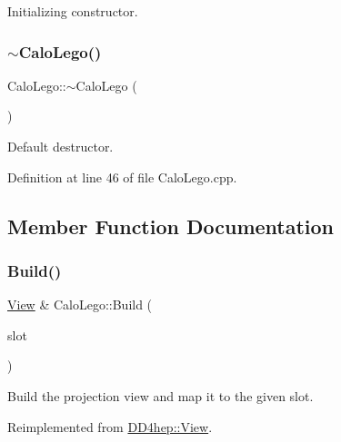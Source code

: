 Initializing constructor. 

\hypertarget{class_d_d4hep_1_1_calo_lego_a8416ec621ced1b3b415e48da1cd5c45b}{}\label{class_d_d4hep_1_1_calo_lego_a8416ec621ced1b3b415e48da1cd5c45b} 
\subsubsection{\texorpdfstring{$\sim$\+Calo\+Lego()}{~CaloLego()}}
{\footnotesize\ttfamily Calo\+Lego\+::$\sim$\+Calo\+Lego (\begin{DoxyParamCaption}{ }\end{DoxyParamCaption})\hspace{0.3cm}{\ttfamily [virtual]}}



Default destructor. 



Definition at line 46 of file Calo\+Lego.\+cpp.



\subsection{Member Function Documentation}
\hypertarget{class_d_d4hep_1_1_calo_lego_ab1ef28e69a78dbe27e6a33b1d22cc713}{}\label{class_d_d4hep_1_1_calo_lego_ab1ef28e69a78dbe27e6a33b1d22cc713} 
\subsubsection{\texorpdfstring{Build()}{Build()}}
{\footnotesize\ttfamily \hyperlink{class_d_d4hep_1_1_view}{View} \& Calo\+Lego\+::\+Build (\begin{DoxyParamCaption}\item[{T\+Eve\+Window $\ast$}]{slot }\end{DoxyParamCaption})\hspace{0.3cm}{\ttfamily [virtual]}}



Build the projection view and map it to the given slot. 



Reimplemented from \hyperlink{class_d_d4hep_1_1_view_ab4e12874a9cb6a599f268b027443c6ce}{D\+D4hep\+::\+View}.




